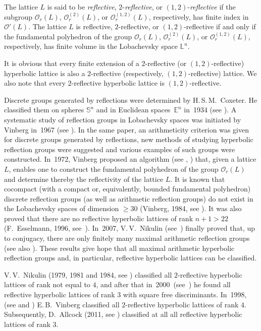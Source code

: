\documentclass[reqno,12pt]{amsart}
\begin{document}
The lattice $L$ is said to be \textit{reflective}, $2$-\textit{reflective}, or $(1{,}2)$-\textit{reflective}
if the subgroup $\mathcal{O}_r(L)$,
$\mathcal{O}^{(2)}_r(L)$, or $\mathcal{O}^{(1{,}2)}_r(L)$, respectively,
has finite index in~$\mathcal{O}'(L)$. The lattice $L$ is reflective, $2$-reflective, or $(1{,}2)$-reflective
if and only if the fundamental polyhedron of the group $\mathcal{O}_r(L)$,
$\mathcal{O}^{(2)}_r(L)$, or $\mathcal{O}^{(1{,}2)}_r(L)$, respectively, has finite volume in the Lobachevsky space
$\mathbb{L}^n$.

It is obvious that every finite extension of a $2$-reflective
(or $(1{,}2)$-reflective) hyperbolic lattice is also a
$2$-reflective (respectively, $(1{,}2)$-reflective) lattice. We also
note  that every $2$-reflective hyperbolic lattice
is $(1{,}2)$-reflective.

Discrete groups generated by reflections were determined by H.\,S.\,M.~Coxeter. He classified them on spheres
$\mathbb{S}^n$ and in Euclidean spaces~$\mathbb{E}^n$ in~1934 (see \cite{Cox34}). A systematic
study of reflection groups in Lobachevsky spaces was initiated by Vinberg
in~1967 (see \cite{Vin67}). In the same paper, an  arithmeticity criterion was given for discrete groups
generated by reflections, new methods  of studying hyperbolic
reflection groups were suggested and various examples of such groups were  constructed.
In~1972, Vinberg proposed an algorithm
(see \cite{Vin72}, \cite{Vin73}) that, given a lattice $L$, enables
one to construct the fundamental polyhedron of the group $\mathcal{O}_r (L)$ and determine thereby
the reflectivity of the lattice $L$. It is known that cocompact
(with a compact or, equivalently, bounded fundamental polyhedron)
discrete reflection groups (as well as arithmetic reflection groups) do not exist in the Lobachevsky spaces of
dimension
$\geqslant 30$ (Vinberg, 1984, see \cite{Vin84}).
It was also proved that there are no reflective hyperbolic lattices of rank
$n+1 > 22$ (F.~Esselmann, 1996, see\ \cite{Ess96}). In~2007, V.\,V.~Nikulin
(see\ \cite{Nik07}) finally proved that, up to conjugacy, there are
only finitely many maximal arithmetic reflection groups (see also \cite{ABSW2008}).
These results give hope that all maximal arithmetic hyperbolic
reflection groups and, in particular, reflective hyperbolic lattices can be classified.


V.\,V.~Nikulin (1979, 1981 and 1984, see \cite{Nik79,Nik81b,Nik84}) classified all
$2$-reflective hyperbolic lattices of
rank not equal to $4$, and after that in~2000\ (see~\cite{Nik00}) he found all reflective hyperbolic lattices of rank $3$
with square free discriminants. In~1998, (see \cite{Vin98} and \cite{Vin07}) E.\,B.~Vinberg
classified all $2$-reflective hyperbolic lattices of rank $4$.
Subsequently, D.~Allcock (2011, see \cite{All12}) classified at all
all reflective hyperbolic lattices of rank $3$.
\end{document}
